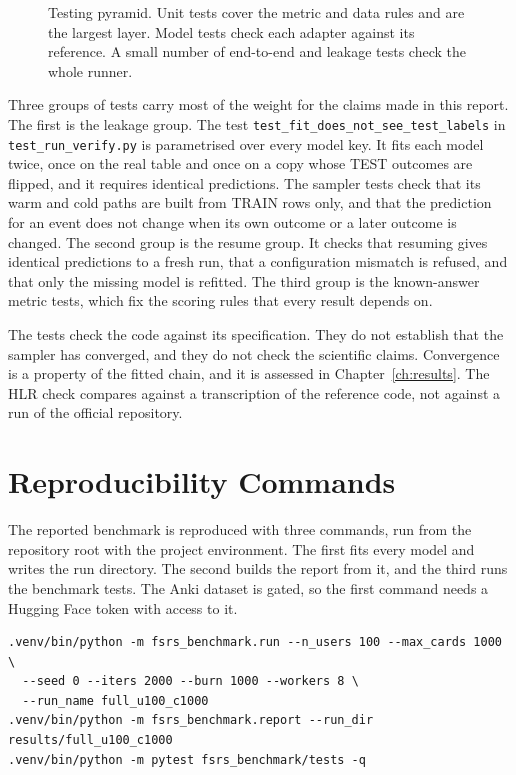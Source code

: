 \begin{figure}[htbp]
  \centering
  
  \caption{Testing pyramid. Unit tests cover the metric and data rules and are the largest layer. Model
    tests check each adapter against its reference. A small number of end-to-end and leakage tests check
    the whole runner.}
  \label{fig:tk_test_pyramid}
\end{figure}

Three groups of tests carry most of the weight for the claims made in this report. The first is the
leakage group. The test \texttt{test\_fit\_does\_not\_see\_test\_labels} in \texttt{test\_run\_verify.py} is
parametrised over every model key. It fits each model twice, once on the real table and once on a copy whose
TEST outcomes are flipped, and it requires identical predictions. The sampler tests check that its warm and
cold paths are built from TRAIN rows only, and that the prediction for an event does not change when its own
outcome or a later outcome is changed. The second group is the resume group. It checks that resuming gives
identical predictions to a fresh run, that a configuration mismatch is refused, and that only the missing
model is refitted. The third group is the known-answer metric tests, which fix the scoring rules that every
result depends on.

The tests check the code against its specification. They do not establish that the sampler has converged,
and they do not check the scientific claims. Convergence is a property of the fitted chain, and it is
assessed in Chapter~\ref{ch:results}. The HLR check compares against a transcription of the reference code,
not against a run of the official repository.

\section{Reproducibility Commands}
\label{sec:impl-reproducibility}

The reported benchmark is reproduced with three commands, run from the repository root with the project
environment. The first fits every model and writes the run directory. The second builds the report from it,
and the third runs the benchmark tests. The Anki dataset is gated, so the first command needs a Hugging Face
token with access to it.

{\footnotesize
\begin{verbatim}
.venv/bin/python -m fsrs_benchmark.run --n_users 100 --max_cards 1000 \
  --seed 0 --iters 2000 --burn 1000 --workers 8 \
  --run_name full_u100_c1000
.venv/bin/python -m fsrs_benchmark.report --run_dir results/full_u100_c1000
.venv/bin/python -m pytest fsrs_benchmark/tests -q
\end{verbatim}
}


